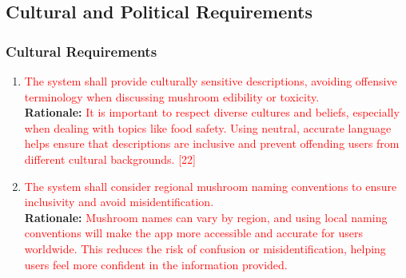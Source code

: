 \documentclass{article}
\begin{document}
\subsection{Cultural and Political Requirements}
\subsubsection{Cultural Requirements}
\begin{enumerate}[{CP-C}1. ]

	\item \textcolor{red}{The system shall provide culturally sensitive descriptions, avoiding offensive terminology when discussing mushroom edibility or toxicity.}\\
	\textbf{Rationale:} \textcolor{red}{It is important to respect diverse cultures and beliefs, especially when dealing with topics like food safety. Using neutral, accurate language helps ensure that descriptions are inclusive and prevent offending users from different cultural backgrounds. [22]}\\

	\item \textcolor{red}{The system shall consider regional mushroom naming conventions to ensure inclusivity and avoid misidentification.}\\
	\textbf{Rationale:} \textcolor{red}{Mushroom names can vary by region, and using local naming conventions will make the app more accessible and accurate for users worldwide. This reduces the risk of confusion or misidentification, helping users feel more confident in the information provided.}\\


\end{enumerate}
\end{document}
